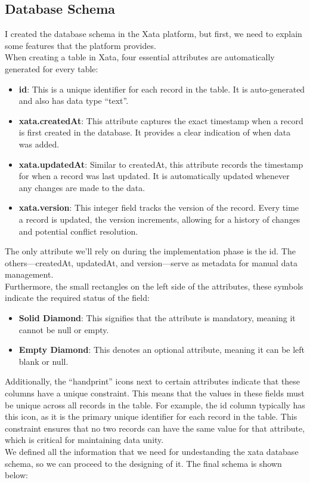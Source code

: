 \subsection{Database Schema}
I created the database schema in the Xata platform, but first, we need to explain some features that the platform provides.\vspace{5mm} \\
When creating a table in Xata, four essential attributes are automatically generated for every table:

\begin{itemize}
    \item \textbf{id}: This is a unique identifier for each record in the table. It is auto-generated and also has data type ``text''.
    \item \textbf{xata.createdAt}: This attribute captures the exact timestamp when a record is first created in the database. It provides a clear indication of when data was added.
    \item \textbf{xata.updatedAt}: Similar to createdAt, this attribute records the timestamp for when a record was last updated. It is automatically updated whenever any changes are made to the data.
    \item \textbf{xata.version}: This integer field tracks the version of the record. Every time a record is updated, the version increments, allowing for a history of changes and potential conflict resolution.
\end{itemize}

\noindent The only attribute we’ll rely on during the implementation phase is the id. The others—createdAt, updatedAt, and version—serve as metadata for manual data management.\vspace{5mm} \\
Furthermore, the small rectangles on the left side of the attributes, these symbols indicate the required status of the field:
\begin{itemize}
    \item \textbf{Solid Diamond}: This signifies that the attribute is mandatory, meaning it cannot be null or empty.
    \item \textbf{Empty Diamond}: This denotes an optional attribute, meaning it can be left blank or null.
\end{itemize}

\noindent Additionally, the ``handprint'' icons next to certain attributes indicate that these columns have a unique constraint. This means that the values in these fields must be unique across all records in the table. For example, the id column typically has this icon, as it is the primary unique identifier for each record in the table. This constraint ensures that no two records can have the same value for that attribute, which is critical for maintaining data unity.\vspace{5mm} \\
We defined all the information that we need for undestanding the xata database schema, so we can proceed to the designing of it. The final schema is shown below:

